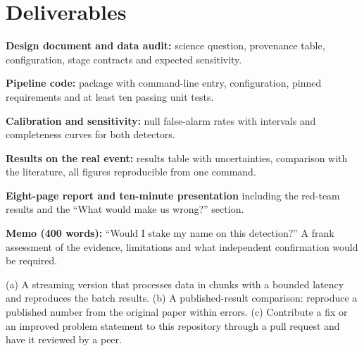 \documentclass[11pt,a4paper]{article}
\begin{document}
\section*{Deliverables}
\begin{delivs}
  \item[D1] \textbf{Design document and data audit:} science question, provenance table, configuration, stage contracts and expected sensitivity.
  \item[D2] \textbf{Pipeline code:} package with command-line entry, configuration, pinned requirements and at least ten passing unit tests.
  \item[D3] \textbf{Calibration and sensitivity:} null false-alarm rates with intervals and completeness curves for both detectors.
  \item[D4] \textbf{Results on the real event:} results table with uncertainties, comparison with the literature, all figures reproducible from one command.
  \item[D5] \textbf{Eight-page report and ten-minute presentation} including the red-team results and the ``What would make us wrong?'' section.
  \item[D6] \textbf{Memo (400 words):} ``Would I stake my name on this detection?'' A frank assessment of the evidence, limitations and what independent confirmation would be required.
  \item[Bonus] (a) A streaming version that processes data in chunks with a bounded latency and reproduces the batch results. (b) A published-result comparison: reproduce a published number from the original paper within errors. (c) Contribute a fix or an improved problem statement to this repository through a pull request and have it reviewed by a peer.
\end{delivs}
\end{document}
